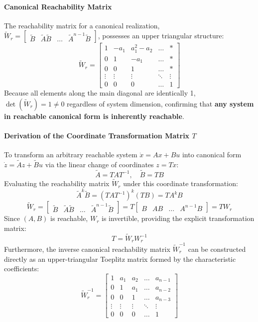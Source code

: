 \documentclass[12pt,onecolumn,twoside ]{article}
\begin{document}
	\paragraph{Canonical Reachability Matrix}
	The reachability matrix for a canonical realization, $\tilde{W}_r = \begin{bmatrix} \tilde{B} & \tilde{A}\tilde{B} & \dots & \tilde{A}^{n-1}\tilde{B} \end{bmatrix}$, possesses an upper triangular structure: \[
	\tilde{W}_r = \begin{bmatrix} 1 & -a_1 & a_1^2 - a_2 & \dots & * \\ 0 & 1 & -a_1 & \dots & * \\ 0 & 0 & 1 & \dots & * \\ \vdots & \vdots & \vdots & \ddots & \vdots \\ 0 & 0 & 0 & \dots & 1 \end{bmatrix}
	\] Because all elements along the main diagonal are identically 1, $\det(\tilde{W}_r) = 1 \neq 0$ regardless of system dimension, confirming that \textbf{any system in reachable canonical form is inherently reachable}.
	\paragraph{Derivation of the Coordinate Transformation Matrix $T$}
	To transform an arbitrary reachable system $\dot{x} = Ax + Bu$ into canonical form $\dot{z} = \tilde{A}z + \tilde{B}u$ via the linear change of coordinates $z = Tx$: \[
	\tilde{A} = TAT^{-1}, \quad \tilde{B} = TB
	\]
	Evaluating the reachability matrix $\tilde{W}_r$ under this coordinate transformation: \[
	\tilde{A}^k \tilde{B} = (TAT^{-1})^k (TB) = T A^k B
	\] \[
	\tilde{W}_r = \begin{bmatrix} \tilde{B} & \tilde{A}\tilde{B} & \dots & \tilde{A}^{n-1}\tilde{B} \end{bmatrix} = T \begin{bmatrix} B & AB & \dots & A^{n-1}B \end{bmatrix} = T W_r
	\]
	Since $(A, B)$ is reachable, $W_r$ is invertible, providing the explicit transformation matrix: \[
	T = \tilde{W}_r W_r^{-1}
	\]
	Furthermore, the inverse canonical reachability matrix $\tilde{W}_r^{-1}$ can be constructed directly as an upper-triangular Toeplitz matrix formed by the characteristic coefficients: \[
	\tilde{W}_r^{-1} = \begin{bmatrix} 1 & a_1 & a_2 & \dots & a_{n-1} \\ 0 & 1 & a_1 & \dots & a_{n-2} \\ 0 & 0 & 1 & \dots & a_{n-3} \\ \vdots & \vdots & \vdots & \ddots & \vdots \\ 0 & 0 & 0 & \dots & 1 \end{bmatrix}
	\]
	
\end{document}
